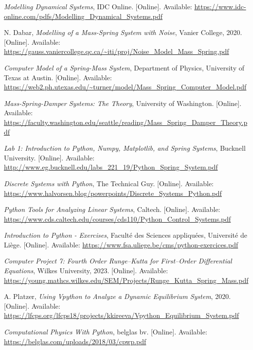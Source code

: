 \documentclass[12pt, a4paper, oneside]{report}
\begin{document}
\begin{thebibliography}{99}
	\textit{Modelling Dynamical Systems}, IDC Online. [Online]. Available: \url{https://www.idc-online.com/pdfs/Modelling_Dynamical_Systems.pdf}

	N. Dabar, \textit{Modelling of a Mass-Spring System with Noise}, Vanier College, 2020. [Online]. Available: \url{https://gauss.vaniercollege.qc.ca/~iti/proj/Noise_Model_Mass_Spring.pdf}

	\textit{Computer Model of a Spring-Mass System}, Department of Physics, University of Texas at Austin. [Online]. Available: \url{https://web2.ph.utexas.edu/~turner/model/Mass_Spring_Computer_Model.pdf}

	\textit{Mass-Spring-Damper Systems: The Theory}, University of Washington. [Online]. Available: \url{https://faculty.washington.edu/seattle/reading/Mass_Spring_Damper_Theory.pdf}

	\textit{Lab 1: Introduction to Python, Numpy, Matplotlib, and Spring Systems}, Bucknell University. [Online]. Available: \url{http://www.eg.bucknell.edu/labs_221_19/Python_Spring_System.pdf}

	\textit{Discrete Systems with Python}, The Technical Guy. [Online]. Available: \url{https://www.halvorsen.blog/powerpoints/Discrete_Systems_Python.pdf}

	\textit{Python Tools for Analyzing Linear Systems}, Caltech. [Online]. Available: \url{https://www.cds.caltech.edu/courses/cds110/Python_Control_Systems.pdf}

	\textit{Introduction to Python - Exercises}, Faculté des Sciences appliquées, Université de Liège. [Online]. Available: \url{https://www.fsa.uliege.be/cms/python-exercices.pdf}

	\textit{Computer Project 7: Fourth Order Runge–Kutta for First–Order Differential Equations}, Wilkes University, 2023. [Online]. Available: \url{https://young.mathcs.wilkes.edu/SEM/Projects/Runge_Kutta_Spring_Mass.pdf}

	A. Platzer, \textit{Using Vpython to Analyze a Dynamic Equilibrium System}, 2020. [Online]. Available: \url{https://lfcps.org/lfcps18/projects/kkireeva/Vpython_Equilibrium_System.pdf}

	\textit{Computational Physics With Python}, belglas bv. [Online]. Available: \url{https://belglas.com/uploads/2018/03/cpwp.pdf}


\end{thebibliography}
\end{document}
